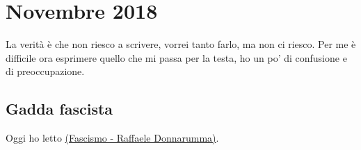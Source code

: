 \section{Novembre 2018}
La verità è che non riesco a scrivere, vorrei tanto farlo, ma non ci riesco. Per me è difficile ora esprimere quello che mi passa per la testa, ho un po' di confusione e di preoccupazione.
\newline
\subsection{Gadda fascista}
Oggi ho letto \href{http://www.gadda.ed.ac.uk/Pages/resources/walks/pge/fascismdonnaru.php}{(Fascismo - Raffaele Donnarumma)}.

